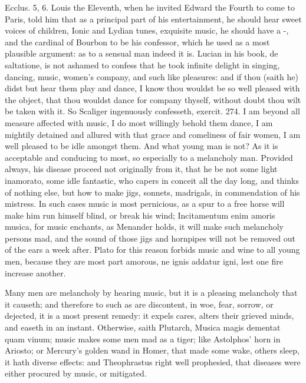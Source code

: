 {Ecclus.  5, 6. Louis the Eleventh, when he invited Edward
the Fourth to come to Paris, told him that as a principal part of his
entertainment, he should hear sweet voices of children, Ionic and
Lydian tunes, exquisite music, he should have a -, and the cardinal of
Bourbon to be his confessor, which he used as a most plausible
argument: as to a sensual man indeed it is.  Lucian in his book,
de saltatione, is not ashamed to confess that he took infinite delight
in singing, dancing, music, women's company, and such like pleasures:
and if thou (saith he) didst but hear them play and dance, I know thou
wouldst be so well pleased with the object, that thou wouldst dance for
company thyself, without doubt thou wilt be taken with it. So Scaliger
ingenuously confesseth, exercit. 274. I am beyond all measure
affected with music, I do most willingly behold them dance, I am
mightily detained and allured with that grace and comeliness of fair
women, I am well pleased to be idle amongst them. And what young man is
not? As it is acceptable and conducing to most, so especially to a
melancholy man. Provided always, his disease proceed not originally
from it, that he be not some light inamorato, some idle fantastic, who
capers in conceit all the day long, and thinks of nothing else, but how
to make jigs, sonnets, madrigals, in commendation of his mistress. In
such cases music is most pernicious, as a spur to a free horse will
make him run himself blind, or break his wind; Incitamentum enim amoris
musica, for music enchants, as Menander holds, it will make such
melancholy persons mad, and the sound of those jigs and hornpipes will
not be removed out of the ears a week after. Plato for this
reason forbids music and wine to all young men, because they are most
part amorous, ne ignis addatur igni, lest one fire increase another.

Many men are melancholy by hearing music, but it is a pleasing
melancholy that it causeth; and therefore to such as are discontent, in
woe, fear, sorrow, or dejected, it is a most present remedy: it expels
cares, alters their grieved minds, and easeth in an instant. Otherwise,
saith Plutarch, Musica magis dementat quam vinum; music makes
some men mad as a tiger; like Astolphos' horn in Ariosto; or Mercury's
golden wand in Homer, that made some wake, others sleep, it hath diverse
effects: and Theophrastus right well prophesied, that diseases
were either procured by music, or mitigated.

}
